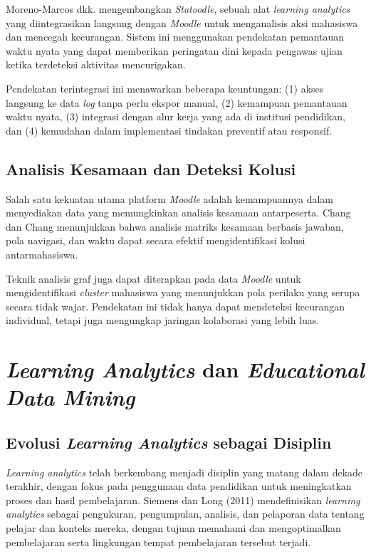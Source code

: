 Moreno-Marcos dkk. \cite{MorenoMarcos2023} mengembangkan \textit{Statoodle}, sebuah alat \textit{learning analytics} yang diintegrasikan langsung dengan \textit{Moodle} untuk menganalisis aksi mahasiswa dan mencegah kecurangan. Sistem ini menggunakan pendekatan pemantauan waktu nyata yang dapat memberikan peringatan dini kepada pengawas ujian ketika terdeteksi aktivitas mencurigakan.

Pendekatan terintegrasi ini menawarkan beberapa keuntungan: (1) akses langsung ke data \textit{log} tanpa perlu ekspor manual, (2) kemampuan pemantauan waktu nyata, (3) integrasi dengan alur kerja yang ada di institusi pendidikan, dan (4) kemudahan dalam implementasi tindakan preventif atau responsif.

\subsection{Analisis Kesamaan dan Deteksi Kolusi}

Salah satu kekuatan utama platform \textit{Moodle} adalah kemampuannya dalam menyediakan data yang memungkinkan analisis kesamaan antarpeserta. Chang dan Chang \cite{Chang2023} menunjukkan bahwa analisis matriks kesamaan berbasis jawaban, pola navigasi, dan waktu dapat secara efektif mengidentifikasi kolusi antarmahasiswa.

Teknik analisis graf juga dapat diterapkan pada data \textit{Moodle} untuk mengidentifikasi \textit{cluster} mahasiswa yang menunjukkan pola perilaku yang serupa secara tidak wajar. Pendekatan ini tidak hanya dapat mendeteksi kecurangan individual, tetapi juga mengungkap jaringan kolaborasi yang lebih luas.

\section{\textit{Learning Analytics} dan \textit{Educational Data Mining}}
\label{sec:learningAnalytics}

\subsection{Evolusi \textit{Learning Analytics} sebagai Disiplin}

\textit{Learning analytics} telah berkembang menjadi disiplin yang matang dalam dekade terakhir, dengan fokus pada penggunaan data pendidikan untuk meningkatkan proses dan hasil pembelajaran. Siemens dan Long (2011) mendefinisikan \textit{learning analytics} sebagai pengukuran, pengumpulan, analisis, dan pelaporan data tentang pelajar dan konteks mereka, dengan tujuan memahami dan mengoptimalkan pembelajaran serta lingkungan tempat pembelajaran tersebut terjadi.

